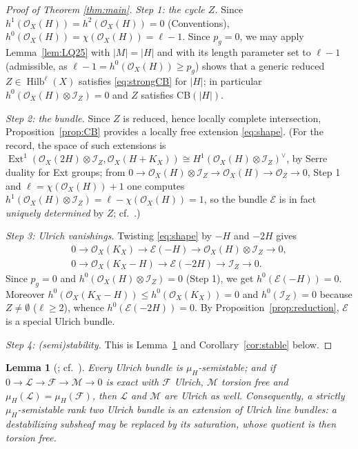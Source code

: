 \documentclass[10pt,a4paper]{amsart}
\newtheorem{lemma}[theorem]{Lemma}
\newcommand{\OO}{\mathcal{O}}
\newcommand{\EE}{\mathcal{E}}
\newcommand{\FF}{\mathcal{F}}
\newcommand{\II}{\mathcal{I}}
\newcommand{\Hilb}{\operatorname{Hilb}}
\newcommand{\Ext}{\operatorname{Ext}}
\newcommand{\len}{\ell}
\begin{document}
\begin{proof}[Proof of Theorem \textup{\ref{thm:main}}]
\emph{Step 1: the cycle $Z$.} Since $h^1(\OO_X(H))=h^2(\OO_X(H))=0$ (Conventions), $h^0(\OO_X(H))=\chi(\OO_X(H))=\len-1$. Since $p_g=0$, we may apply Lemma~\ref{lem:LQ25} with $|M|=|H|$ and with its length parameter set to $\len-1$ (admissible, as $\len-1=h^0(\OO_X(H))\ge p_g$) shows that a generic reduced $Z\in\Hilb^{\len}(X)$ satisfies \eqref{eq:strongCB} for $|H|$; in particular $h^0(\OO_X(H)\otimes\II_Z)=0$ and $Z$ satisfies CB$(|H|)$.

\smallskip
\noindent \emph{Step 2: the bundle.} Since $Z$ is reduced, hence locally complete intersection, Proposition~\ref{prop:CB} provides a locally free extension \eqref{eq:shape}. (For the record, the space of such extensions is
$\Ext^1(\OO_X(2H)\otimes\II_Z,\OO_X(H+K_X))\cong H^1(\OO_X(H)\otimes\II_Z)^\vee$,
by Serre duality for Ext groups; from $0\to\OO_X(H)\otimes\II_Z\to\OO_X(H)\to\OO_Z\to 0$, Step 1 and $\len=\chi(\OO_X(H))+1$ one computes $h^1(\OO_X(H)\otimes\II_Z)=\len-\chi(\OO_X(H))=1$, so the bundle $\EE$ is in fact \emph{uniquely determined} by $Z$; cf.\ \cite[Rem.~3.4]{Cas17}.)

\smallskip
\noindent \emph{Step 3: Ulrich vanishings.} Twisting \eqref{eq:shape} by $-H$ and $-2H$ gives
\begin{gather*}
0\to\OO_X(K_X)\to\EE(-H)\to\OO_X(H)\otimes\II_Z\to 0,\\
0\to\OO_X(K_X-H)\to\EE(-2H)\to\II_Z\to 0 .
\end{gather*}
Since $p_g=0$ and $h^0(\OO_X(H)\otimes\II_Z)=0$ (Step 1), we get $h^0(\EE(-H))=0$. Moreover $h^0(\OO_X(K_X-H))\le h^0(\OO_X(K_X))=0$ and $h^0(\II_Z)=0$ because $Z\neq\emptyset$ ($\len\ge 2$), whence $h^0(\EE(-2H))=0$. By Proposition~\ref{prop:reduction}, $\EE$ is a special Ulrich bundle.

\smallskip
\noindent \emph{Step 4: (semi)stability.} This is Lemma~\ref{lem:semistable} and Corollary~\ref{cor:stable} below.
\end{proof}

\begin{lemma}[{\cite[Thm.~2.9]{CHGS12}}; cf.\ {\cite[Thm.~4.1(3)]{Cas17}}]\label{lem:semistable}
Every Ulrich bundle is $\mu_H$-semistable; and if $0\to\mathcal L\to\FF\to\mathcal M\to0$ is exact with $\FF$ Ulrich, $\mathcal M$ torsion free and $\mu_H(\mathcal L)=\mu_H(\FF)$, then $\mathcal L$ and $\mathcal M$ are Ulrich as well. Consequently, a strictly $\mu_H$-semistable rank two Ulrich bundle is an extension of Ulrich line bundles: a destabilizing subsheaf may be replaced by its saturation, whose quotient is then torsion free.
\end{lemma}
\end{document}
